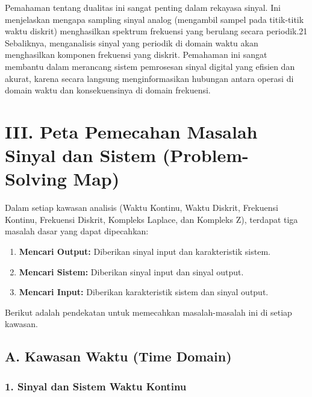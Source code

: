 \documentclass[
  letterpaper,
  DIV=11,
  numbers=noendperiod]{scrreprt}
\begin{document}
Pemahaman tentang dualitas ini sangat penting dalam rekayasa sinyal. Ini
menjelaskan mengapa sampling sinyal analog (mengambil sampel pada
titik-titik waktu diskrit) menghasilkan spektrum frekuensi yang berulang
secara periodik.21 Sebaliknya, menganalisis sinyal yang periodik di
domain waktu akan menghasilkan komponen frekuensi yang diskrit.
Pemahaman ini sangat membantu dalam merancang sistem pemrosesan sinyal
digital yang efisien dan akurat, karena secara langsung menginformasikan
hubungan antara operasi di domain waktu dan konsekuensinya di domain
frekuensi.

\section{III. Peta Pemecahan Masalah Sinyal dan Sistem (Problem-Solving
Map)}\label{iii.-peta-pemecahan-masalah-sinyal-dan-sistem-problem-solving-map}

Dalam setiap kawasan analisis (Waktu Kontinu, Waktu Diskrit, Frekuensi
Kontinu, Frekuensi Diskrit, Kompleks Laplace, dan Kompleks Z), terdapat
tiga masalah dasar yang dapat dipecahkan:

\begin{enumerate}
\def\labelenumi{\arabic{enumi}.}
\item
  \textbf{Mencari Output:} Diberikan sinyal input dan karakteristik
  sistem.
\item
  \textbf{Mencari Sistem:} Diberikan sinyal input dan sinyal output.
\item
  \textbf{Mencari Input:} Diberikan karakteristik sistem dan sinyal
  output.
\end{enumerate}

Berikut adalah pendekatan untuk memecahkan masalah-masalah ini di setiap
kawasan.

\subsection{A. Kawasan Waktu (Time
Domain)}\label{a.-kawasan-waktu-time-domain-1}

\subsubsection{1. Sinyal dan Sistem Waktu
Kontinu}\label{sinyal-dan-sistem-waktu-kontinu}
\end{document}
